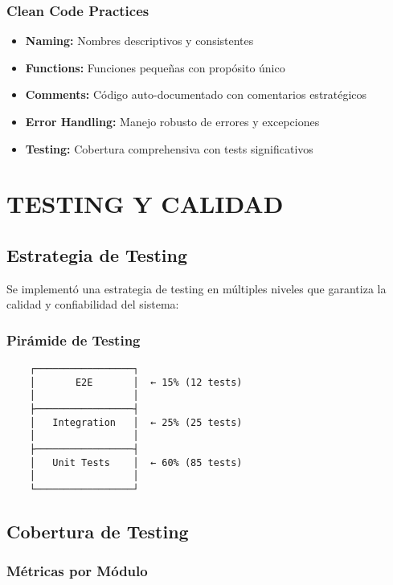 \documentclass[12pt,a4paper]{article}
\begin{document}
\subsubsection{Clean Code Practices}

\begin{itemize}
    \item \textbf{Naming:} Nombres descriptivos y consistentes
    \item \textbf{Functions:} Funciones pequeñas con propósito único
    \item \textbf{Comments:} Código auto-documentado con comentarios estratégicos
    \item \textbf{Error Handling:} Manejo robusto de errores y excepciones
    \item \textbf{Testing:} Cobertura comprehensiva con tests significativos
\end{itemize}

\section{TESTING Y CALIDAD}

\subsection{Estrategia de Testing}

Se implementó una estrategia de testing en múltiples niveles que garantiza la calidad y confiabilidad del sistema:

\subsubsection{Pirámide de Testing}

\begin{verbatim}
    ┌─────────────────┐
    │       E2E       │  ← 15% (12 tests)
    │                 │
    ├─────────────────┤
    │   Integration   │  ← 25% (25 tests)
    │                 │
    ├─────────────────┤
    │   Unit Tests    │  ← 60% (85 tests)
    │                 │
    └─────────────────┘
\end{verbatim}

\subsection{Cobertura de Testing}

\subsubsection{Métricas por Módulo}
\end{document}
